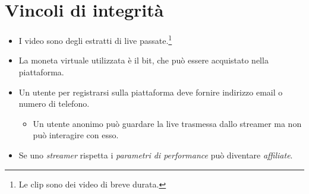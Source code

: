 \section{Vincoli di integrità}
\begin{itemize}
    \item I video sono degli estratti di live passate.\footnote{Le clip sono dei video di breve durata.}
    \item La moneta virtuale utilizzata è il bit, che può essere acquistato nella piattaforma.
    \item Un utente per registrarsi sulla piattaforma deve fornire indirizzo email o numero di telefono.
    \begin{itemize}
        \item Un utente anonimo può guardare la live trasmessa dallo streamer ma non può interagire con esso. 
    \end{itemize}
        \item Se uno \textit{streamer} rispetta i \textit{parametri di performance} può diventare \textit{affiliate}.
\end{itemize}